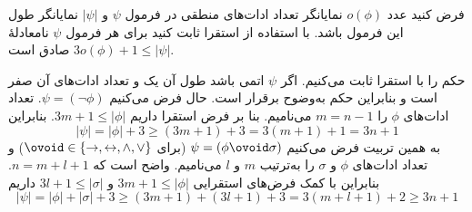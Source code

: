 فرض کنید عدد $o(\phi)$ نمایانگر تعداد ادات‌های منطقی در فرمول $\psi$ و $|\psi|$ نمایانگر طول این فرمول باشد. با استفاده از استقرا ثابت کنید برای هر فرمول $\psi$ نامعادلهٔ
$3o(\phi)+1\leq|\psi|$ صادق است.
\begin{ans}
حکم را با استقرا ثابت می‌کنیم. اگر $\psi$ اتمی باشد طول آن یک و تعداد ادات‌های آن صفر است و بنابراین حکم به‌وضوح برقرار است. حال فرض می‌کنیم
$\psi=(\neg\phi)$.
تعداد ادات‌های $\phi$ را $m=n-1$ می‌نامیم. بنا بر فرض استقرا داریم
$3m+1\leq|\phi|$.
بنابراین
$$
|\psi|=|\phi|+3\geq(3m+1)+3=3(m+1)+1=3n+1
$$
به همین تربیت فرض می‌کنیم
$\psi=(\phi\ovoid\sigma)$
(برای
$\ovoid\in\{\to,\leftrightarrow,\wedge,\vee\}$)
و تعداد ادات‌های $\phi$ و $\sigma$ را به‌ترتیب $m$ و $l$ می‌نامیم. واضح است که $n=m+l+1$. بنابراین با کمک فرض‌های استقرایی
$3m+1\leq|\phi|$
و
$3l+1\leq|\sigma|$
داریم
$$|\psi|=|\phi|+|\sigma|+3\geq(3m+1)+(3l+1)+3=3(m+l+1)+2\geq3n+1$$
\end{ans}
